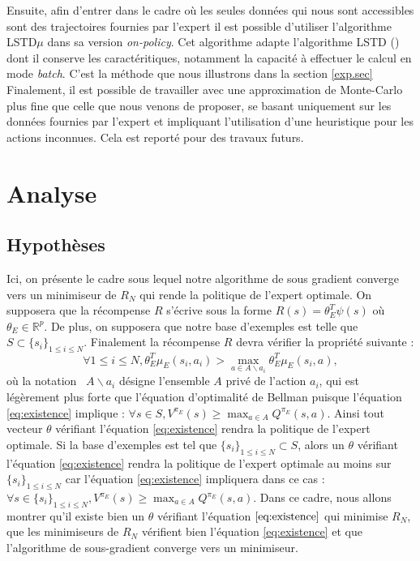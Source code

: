 \documentclass[publibook-draft]{CAp2012}
\begin{document}
Ensuite, afin d'entrer dans le cadre où les seules données qui nous sont accessibles sont des trajectoires fournies par l'expert il est possible d'utiliser l'algorithme LSTD$\mu$ \citep{klein2011batch} dans sa version \emph{on-policy}. Cet algorithme adapte l'algorithme LSTD (\cite{bradtke1996linear}) dont il conserve les caractéritiques, notamment la capacité à effectuer le calcul en mode {\it batch}. C'est la méthode que nous illustrons dans la section \ref{exp.sec}\\

Finalement, il est possible de travailler avec une approximation de Monte-Carlo plus fine que celle que nous venons de proposer, se basant uniquement sur les données fournies par l'expert et impliquant l'utilisation d'une heuristique pour les actions inconnues. Cela est reporté pour des travaux futurs.
\section{Analyse}\label{proof.sec}
\subsection{Hypothèses}
Ici, on présente le cadre sous lequel notre algorithme de sous gradient converge vers un minimiseur de $R_N$ qui rende la politique de l'expert optimale. On supposera que la récompense $R$ s'écrive sous la forme $R(s)=\theta_E^T\psi(s)$ où $\theta_E\in\mathbb{R}^p$. De plus, on supposera que notre base d'exemples est telle que $S\subset \{s_i\}_{1\leq i \leq N}$. Finalement la récompense $R$ devra vérifier la propriété suivante :
\begin{equation}\label{eq:existence}
\forall 1\leq i \leq N, \theta_E^T\mu_E(s_i,a_i)>\max_{a\in A \backslash a_i}\theta_E^T\mu_E(s_i,a),
\end{equation}
où la notation ~$A \backslash a_i$ désigne l'ensemble $A$ privé de l'action $a_i$, qui est légèrement plus forte que l'équation d'optimalité de Bellman puisque l'équation \eqref{eq:existence} implique : $\forall s\in S, V^{\pi_E}(s)\geq\max_{a\in A}Q^{\pi_E}(s,a)$. Ainsi tout vecteur $\theta$ vérifiant l'équation \eqref{eq:existence} rendra la politique de l'expert optimale. Si la base d'exemples est tel que $\{s_i\}_{1\leq i \leq N}\subset S$, alors un $\theta$ vérifiant l'équation \eqref{eq:existence} rendra la politique de l'expert optimale au moins sur $\{s_i\}_{1\leq i \leq N}$ car l'équation \eqref{eq:existence} impliquera dans ce cas :$\forall s\in \{s_i\}_{1\leq i \leq N}, V^{\pi_E}(s)\geq\max_{a\in A}Q^{\pi_E}(s,a)$.
Dans ce cadre, nous allons montrer qu'il existe bien un $\theta$ vérifiant l'équation $\eqref{eq:existence}$ qui minimise $R_N$,  que les minimiseurs de $R_N$ vérifient bien l'équation \eqref{eq:existence} et que l'algorithme de sous-gradient converge vers un minimiseur.
\end{document}
